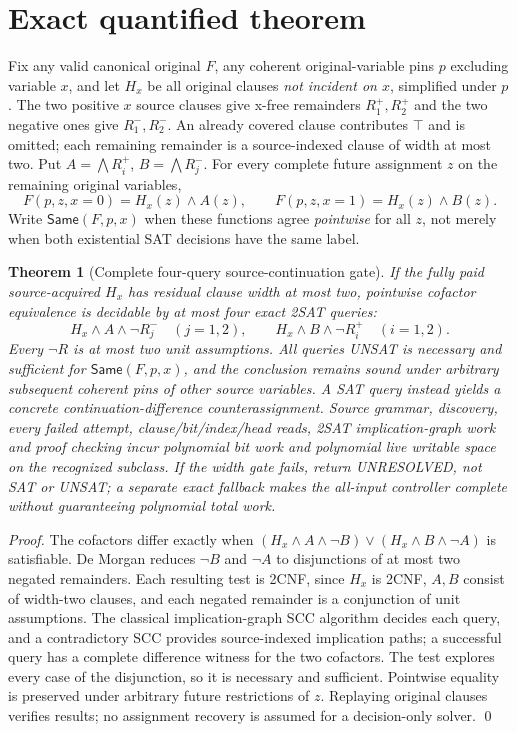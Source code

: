 \documentclass[11pt]{article}
\newtheorem{theorem}{Theorem}
\begin{document}
\section{Exact quantified theorem}
Fix any valid canonical original $F$, any coherent original-variable pins $p$ excluding variable $x$, and let $H_x$ be all original clauses \emph{not incident on $x$}, simplified under $p$. The two positive $x$ source clauses give x-free remainders $R^+_1,R^+_2$ and the two negative ones give $R^-_1,R^-_2$. An already covered clause contributes $\top$ and is omitted; each remaining remainder is a source-indexed clause of width at most two. Put $A=\bigwedge R^+_i$, $B=\bigwedge R^-_j$. For every complete future assignment $z$ on the remaining original variables,
\[
F(p,z,x=0)=H_x(z)\land A(z),\qquad F(p,z,x=1)=H_x(z)\land B(z).
\]
Write $\mathsf{Same}(F,p,x)$ when these functions agree \emph{pointwise} for all $z$, not merely when both existential SAT decisions have the same label.
\begin{theorem}[Complete four-query source-continuation gate]
If the fully paid source-acquired $H_x$ has residual clause width at most two, pointwise cofactor equivalence is decidable by at most four exact 2SAT queries:
\[
H_x\land A\land\neg R^-_j\quad (j=1,2),\qquad
H_x\land B\land\neg R^+_i\quad (i=1,2).
\]
Every $\neg R$ is at most two unit assumptions. All queries UNSAT is necessary and sufficient for $\mathsf{Same}(F,p,x)$, and the conclusion remains sound under arbitrary subsequent coherent pins of other source variables. A SAT query instead yields a concrete continuation-difference counterassignment. Source grammar, discovery, every failed attempt, clause/bit/index/head reads, 2SAT implication-graph work and proof checking incur polynomial bit work and polynomial live writable space on the recognized subclass. If the width gate fails, return UNRESOLVED, not SAT or UNSAT; a separate exact fallback makes the all-input controller complete without guaranteeing polynomial total work.
\end{theorem}
\begin{proof}
The cofactors differ exactly when $(H_x\land A\land\neg B)\lor(H_x\land B\land\neg A)$ is satisfiable. De Morgan reduces $\neg B$ and $\neg A$ to disjunctions of at most two negated remainders. Each resulting test is 2CNF, since $H_x$ is 2CNF, $A,B$ consist of width-two clauses, and each negated remainder is a conjunction of unit assumptions. The classical implication-graph SCC algorithm decides each query, and a contradictory SCC provides source-indexed implication paths; a successful query has a complete difference witness for the two cofactors. The test explores every case of the disjunction, so it is necessary and sufficient. Pointwise equality is preserved under arbitrary future restrictions of $z$. Replaying original clauses verifies results; no assignment recovery is assumed for a decision-only solver. \qed
\end{proof}
\end{document}
